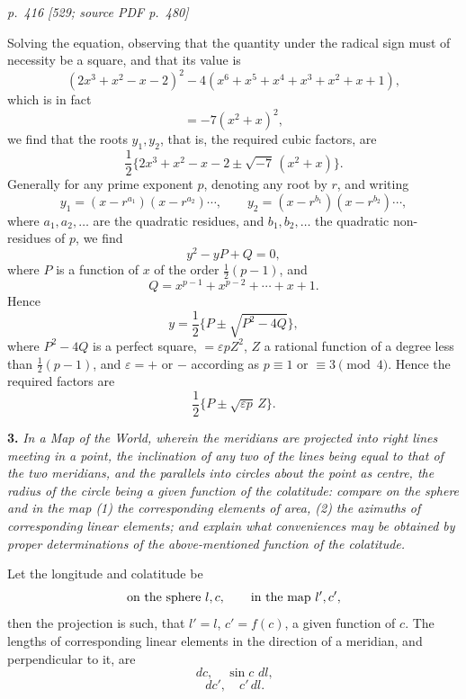 \documentclass[11pt,a4paper]{article}
\newcommand{\pagemarker}[3]{\par\bigskip\noindent\textit{p.~#1 [#2; source PDF p.~#3]}\par\smallskip}
\newcommand{\dd}{\,d}
\newcommand{\eps}{\varepsilon}
\begin{document}
\pagemarker{416}{529}{480}

Solving the equation, observing that the quantity under the radical sign must of
necessity be a square, and that its value is
\[
(2x^3+x^2-x-2)^2-4(x^6+x^5+x^4+x^3+x^2+x+1),
\]
which is in fact
\[
=-7(x^2+x)^2,
\]
we find that the roots $y_1,y_2$, that is, the required cubic factors, are
\[
\frac12\{2x^3+x^2-x-2\pm\sqrt{-7}\,(x^2+x)\}.
\]
Generally for any prime exponent $p$, denoting any root by $r$, and writing
\[
y_1=(x-r^{a_1})(x-r^{a_2})\cdots,\qquad
y_2=(x-r^{b_1})(x-r^{b_2})\cdots,
\]
where $a_1,a_2,\ldots$ are the quadratic residues, and $b_1,b_2,\ldots$ the quadratic
non-residues of $p$, we find
\[
y^2-yP+Q=0,
\]
where $P$ is a function of $x$ of the order $\frac12(p-1)$, and
\[
Q=x^{p-1}+x^{p-2}+\cdots+x+1.
\]
Hence
\[
y=\frac12\{P\pm\sqrt{P^2-4Q}\},
\]
where $P^2-4Q$ is a perfect square, $=\eps pZ^2$, $Z$ a rational function of a degree
less than $\frac12(p-1)$, and $\eps=+$ or $-$ according as $p\equiv1$ or $\equiv3
\pmod 4$. Hence the required factors are
\[
\frac12\{P\pm\sqrt{\eps p}\,Z\}.
\]

\textbf{3.} \textit{In a Map of the World, wherein the meridians are projected into right
lines meeting in a point, the inclination of any two of the lines being equal to that
of the two meridians, and the parallels into circles about the point as centre, the
radius of the circle being a given function of the colatitude: compare on the sphere
and in the map (1) the corresponding elements of area, (2) the azimuths of
corresponding linear elements; and explain what conveniences may be obtained by
proper determinations of the above-mentioned function of the colatitude.}

Let the longitude and colatitude be
\[
\hbox{on the sphere }l,c,\qquad
\hbox{in the map }l',c',
\]
then the projection is such, that $l'=l$, $c'=f(c)$, a given function of $c$.
The lengths of corresponding linear elements in the direction of a meridian, and
perpendicular to it, are
\[
\dd c,\quad \sin c\,\dd l,
\]
\[
\dd c',\quad c'\dd l.
\]
\end{document}
